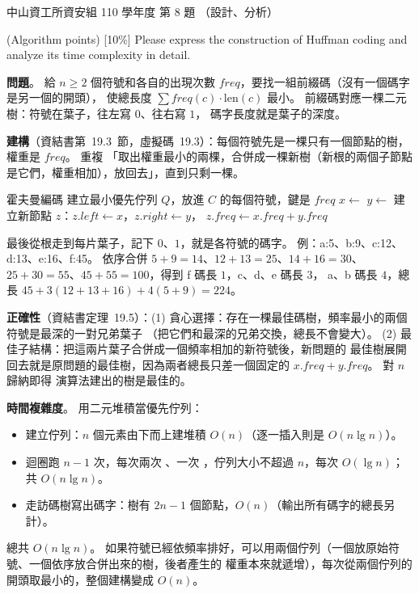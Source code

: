 \begin{pastexam}[label={px:nsysu-110-dmalg-04}]{中山資工所資安組 110 學年度 第 8 題}
（設計、分析）

(Algorithm points) {[10\%]} Please express the construction of Huffman coding and analyze its time
complexity in detail.
\end{pastexam}

\begin{pastsoln}
\textbf{問題}。 給 $n \ge 2$ 個符號和各自的出現次數 $\mathit{freq}$，要找一組前綴碼（沒有一個碼字是另一個的開頭），
使總長度 $\sum \mathit{freq}(c) \cdot \mathrm{len}(c)$ 最小。 前綴碼對應一棵二元樹：符號在葉子，往左寫 $0$、往右寫 $1$，
碼字長度就是葉子的深度。

\textbf{建構}（資結書第~19.3~節，虛擬碼~19.3）：每個符號先是一棵只有一個節點的樹，權重是 $\mathit{freq}$。 重複
「取出權重最小的兩棵，合併成一棵新樹（新根的兩個子節點是它們，權重相加），放回去」，直到只剩一棵。
\begin{pseudo}{霍夫曼編碼}
 
    \State 建立最小優先佇列 $Q$，放進 $C$ 的每個符號，鍵是 $\mathit{freq}$
        \State $x \gets$ 
        \State $y \gets$ 
        \State 建立新節點 $z$：$z.\mathit{left} \gets x$，$z.\mathit{right} \gets y$，
        $z.\mathit{freq} \gets x.\mathit{freq} + y.\mathit{freq}$
        \State {}
    \EndFor
    \State \Return {} 
\EndFunction
\end{pseudo}
最後從根走到每片葉子，記下 $0$、$1$，就是各符號的碼字。 例：a:5、b:9、c:12、d:13、e:16、f:45。 依序合併
$5 + 9 = 14$、$12 + 13 = 25$、$14 + 16 = 30$、$25 + 30 = 55$、$45 + 55 = 100$，得到 f 碼長 $1$，c、d、e 碼長 $3$，
a、b 碼長 $4$，總長 $45 + 3(12 + 13 + 16) + 4(5 + 9) = 224$。

\textbf{正確性}（資結書定理~19.5）：(1) 貪心選擇：存在一棵最佳碼樹，頻率最小的兩個符號是最深的一對兄弟葉子
（把它們和最深的兄弟交換，總長不會變大）。 (2) 最佳子結構：把這兩片葉子合併成一個頻率相加的新符號後，新問題的
最佳樹展開回去就是原問題的最佳樹，因為兩者總長只差一個固定的 $x.\mathit{freq} + y.\mathit{freq}$。 對 $n$ 歸納即得
演算法建出的樹是最佳的。

\textbf{時間複雜度}。 用二元堆積當優先佇列：
\begin{itemize}
\item 建立佇列：$n$ 個元素由下而上建堆積 $O(n)$（逐一插入則是 $O(n \lg n)$）。
\item 迴圈跑 $n - 1$ 次，每次兩次 、一次 ，佇列大小不超過 $n$，每次 $O(\lg n)$；
共 $O(n \lg n)$。
\item 走訪碼樹寫出碼字：樹有 $2n - 1$ 個節點，$O(n)$（輸出所有碼字的總長另計）。
\end{itemize}
總共 $O(n \lg n)$。 如果符號已經依頻率排好，可以用兩個佇列（一個放原始符號、一個依序放合併出來的樹，後者產生的
權重本來就遞增），每次從兩個佇列的開頭取最小的，整個建構變成 $O(n)$。
\end{pastsoln}

